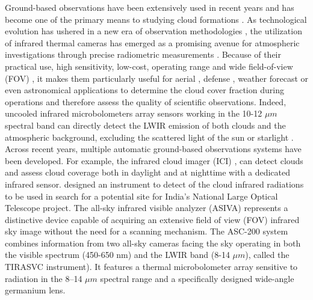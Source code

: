 \documentclass[amt, article]{copernicus}
\begin{document}
Ground-based observations have been extensively used in recent years and has become one of the primary means to studying cloud formations \citep{paczynski2000monitoring}. As technological evolution has ushered in a new era of observation methodologies \citep{mandat2014all}, the utilization of infrared thermal cameras has emerged as a promising avenue for atmospheric investigations through precise radiometric measurements \citep{Szejwach1982, Shaw_2013, liandrat2017cloud, lopez2017contribution, Klebe2014, nikolenko2021infrared}.
Because of their practical use, high sensitivity, low-cost, operating range and wide field-of-view (FOV) \citep{Rogalski2011,Rogalski2014,Kimata2018}, it makes them particularly useful for aerial \citep{wilczak1996ground}, defense \citep{gallo1993low}, weather forecast \citep{sun2008whole, Liandrat2017} or even astronomical applications \citep{Klebe2010,Klebe2012,Klebe2014} to determine the cloud cover fraction during operations and therefore assess the quality of scientific observations. Indeed, uncooled infrared microbolometers array sensors working in the 10-12 $\mu m$ spectral band can directly detect the LWIR emission of both clouds and the atmospheric background, excluding the scattered light of the sun or starlight \citep{Houghton1972}.
Across recent years, multiple automatic ground-based observations systems have been developed. For example, the infrared cloud imager (ICI) \citep{ICI}, can detect clouds and assess cloud coverage both in daylight and at nighttime with a dedicated infrared sensor. \citet{Sharma2015} designed an instrument to detect of the cloud infrared radiations to be used in search for a potential site for India’s National Large Optical Telescope project.
The all-sky infrared visible analyzer (ASIVA) \citep{Klebe2014} represents a distinctive device capable of acquiring an extensive field of view (FOV) infrared sky image without the need for a scanning mechanism. The ASC-200 system \citep{rs13091852} combines information from two all-sky cameras facing the sky operating in both the visible spectrum (450-650 nm) and the LWIR band (8-14 $\mu m$), called the TIRASVC instrument). It features a thermal microbolometer array sensitive to radiation in the 8–14 $\mu m$ spectral range and a specifically designed wide-angle germanium lens.
\end{document}
